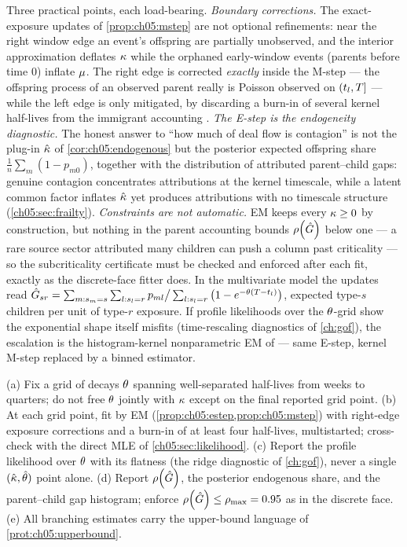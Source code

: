 Three practical points, each load-bearing. \emph{Boundary corrections.}
The exact-exposure updates of \cref{prop:ch05:mstep} are not optional
refinements: near the right window edge an event's offspring are
partially unobserved, and the interior approximation deflates $\kappa$
while the orphaned early-window events (parents before time $0$) inflate
$\mu$. The right edge is corrected \emph{exactly} inside the M-step ---
the offspring process of an observed parent really is Poisson observed on
$(t_l,T]$ --- while the left edge is only mitigated, by discarding a
burn-in of several kernel half-lives from the immigrant accounting
\citep{veenschoenberg2008}. \emph{The E-step is the endogeneity
diagnostic.} The honest answer to ``how much of deal flow is contagion''
is not the plug-in $\hat{\kappa}$ of \cref{cor:ch05:endogenous} but the
posterior expected offspring share $\frac1n\sum_m (1 - p_{m0})$, together
with the distribution of attributed parent--child gaps: genuine contagion
concentrates attributions at the kernel timescale, while a latent common
factor inflates $\hat{\kappa}$ yet produces attributions with no timescale
structure (\cref{ch05:sec:frailty}). \emph{Constraints are not
automatic.} EM keeps every $\kappa \ge 0$ by construction, but nothing
in the parent accounting bounds $\rho\!\left(\hat{G}\right)$ below one --- a rare
source sector attributed many children can push a column past criticality
--- so the subcriticality certificate must be checked and enforced after
each fit, exactly as the discrete-face fitter does. In the multivariate
model the updates read $\hat{G}_{sr} = \sum_{m: s_m=s}\sum_{l: s_l=r}
p_{ml} \big/ \sum_{l: s_l = r}\big(1 - e^{-\theta(T - t_l)}\big)$,
expected type-$s$ children per unit of type-$r$ exposure. If profile
likelihoods over the $\theta$-grid show the exponential shape itself
misfits (time-rescaling diagnostics of \cref{ch:gof}), the escalation is
the histogram-kernel nonparametric EM of \citet{lewismohler2011} --- same
E-step, kernel M-step replaced by a binned estimator.

\begin{protocol}\label{prot:ch05:estimation}
(a) Fix a grid of decays $\theta$ spanning well-separated half-lives from
weeks to quarters; do not free $\theta$ jointly with $\kappa$ except on
the final reported grid point. (b) At each grid point, fit by EM
(\cref{prop:ch05:estep,prop:ch05:mstep}) with right-edge exposure
corrections and a burn-in of at least four half-lives, multistarted;
cross-check with the direct MLE of
\cref{ch05:sec:likelihood}. (c) Report the profile likelihood over
$\theta$ with its flatness (the ridge diagnostic of \cref{ch:gof}), never
a single $(\hat{\kappa},\hat{\theta})$ point alone. (d) Report
$\rho\!\left(\hat{G}\right)$, the posterior endogenous share, and the
parent--child gap histogram; enforce $\rho\!\left(\hat{G}\right) \le \rho_{\max} =
0.95$ as in the discrete face. (e) All branching estimates carry the
upper-bound language of \cref{prot:ch05:upperbound}.
\end{protocol}

